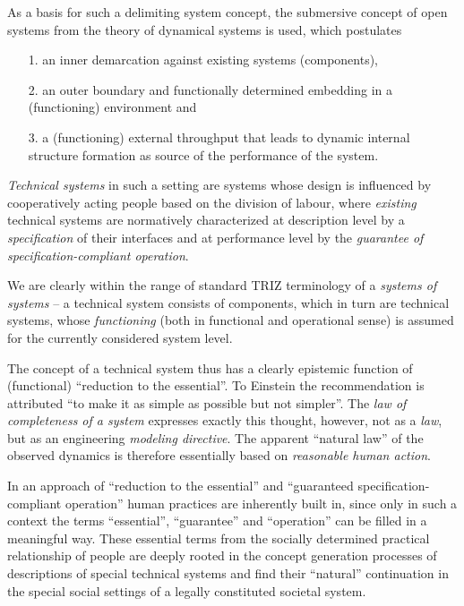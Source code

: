 \documentclass{llncs}
\begin{document}
As a basis for such a delimiting system concept, the submersive concept of
open systems from the theory of dynamical systems \cite{Bertalanffy1950} is
used, which postulates
\begin{itemize}
\item [1.] an inner demarcation against existing systems (components),
\item [2.] an outer boundary and functionally determined embedding in a
  (functioning) environment and
\item [3.] a (functioning) external throughput that leads to dynamic internal
  structure formation as source of the performance of the system.
\end{itemize}

\emph{Technical systems} in such a setting are systems whose design is
influenced by cooperatively acting people based on the division of labour,
where \emph{existing} technical systems are normatively characterized at
description level by a \emph{specification} of their interfaces and at
performance level by the \emph{guarantee of specification-compliant
  operation}.

We are clearly within the range of standard TRIZ terminology of a
\emph{systems of systems} -- a technical system consists of components, which
in turn are technical systems, whose \emph{functioning} (both in functional
and operational sense) is assumed for the currently considered system level.

The concept of a technical system thus has a clearly epistemic function of
(functional) ``reduction to the essential''. To Einstein the recommendation is
attributed ``to make it as simple as possible but not simpler''. The \emph{law
  of completeness of a system} expresses exactly this thought, however, not as
a \emph{law}, but as an engineering \emph{modeling directive}. The apparent
``natural law'' of the observed dynamics is therefore essentially based on 
\emph{reasonable human action}.

In an approach of ``reduction to the essential'' and ``guaranteed
specification-compliant operation'' human practices are inherently built in,
since only in such a context the terms ``essential'', ``guarantee'' and
``operation'' can be filled in a meaningful way. These essential terms from
the socially determined practical relationship of people are deeply rooted in
the concept generation processes of descriptions of special technical systems
and find their ``natural'' continuation in the special social settings of a
legally constituted societal system.
\end{document}
